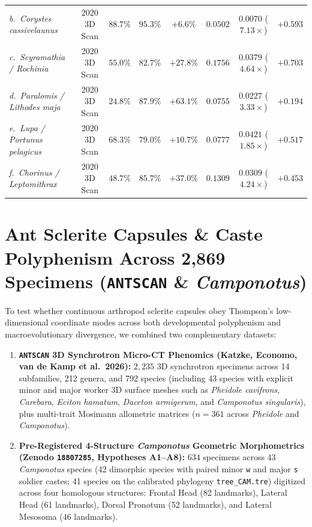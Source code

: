\documentclass[10pt,twocolumn]{article}
\begin{document}
\begin{table}[t!]
\begin{tabular}{lccccccc}
\midrule
\emph{b.\ Corystes cassivelaunus} & 2020 3D Scan & $88.7\%$ & $\mathbf{95.3\%}$ & $+6.6\%$ & $0.0502$ & $\mathbf{0.0070}$ ($7.13\times$) & $+0.593$ \\
\emph{c.\ Scyramathia / Rochinia} & 2020 3D Scan & $55.0\%$ & $\mathbf{82.7\%}$ & $\mathbf{+27.8\%}$ & $0.1756$ & $\mathbf{0.0379}$ ($4.64\times$) & $+0.703$ \\
\emph{d.\ Paralomis / Lithodes maja} & 2020 3D Scan & $24.8\%$ & $\mathbf{87.9\%}$ & $\mathbf{+63.1\%}$ & $0.0755$ & $\mathbf{0.0227}$ ($3.33\times$) & $+0.194$ \\
\emph{e.\ Lupa / Portunus pelagicus} & 2020 3D Scan & $68.3\%$ & $\mathbf{79.0\%}$ & $+10.7\%$ & $0.0777$ & $\mathbf{0.0421}$ ($1.85\times$) & $+0.517$ \\
\emph{f.\ Chorinus / Leptomithrax} & 2020 3D Scan & $48.7\%$ & $\mathbf{85.7\%}$ & $\mathbf{+37.0\%}$ & $0.1309$ & $\mathbf{0.0309}$ ($4.24\times$) & $+0.453$ \\
\bottomrule
\end{tabular}
\end{table}

\section{Ant Sclerite Capsules \& Caste Polyphenism Across 2,869 Specimens (\texttt{ANTSCAN} \& \emph{Camponotus})}

To test whether continuous arthropod sclerite capsules obey Thompson's low-dimensional coordinate modes across both developmental polyphenism and macroevolutionary divergence, we combined two complementary datasets:
\begin{enumerate}
  \item \textbf{\texttt{ANTSCAN} 3D Synchrotron Micro-CT Phenomics (Katzke, Economo, van de Kamp et al.\ 2026):} $2{,}235$ 3D synchrotron specimens across 14 subfamilies, 212 genera, and 792 species (including 43 species with explicit minor and major worker 3D surface meshes such as \emph{Pheidole cavifrons}, \emph{Carebara}, \emph{Eciton hamatum}, \emph{Daceton armigerum}, and \emph{Camponotus singularis}), plus multi-trait Mosimann allometric matrices ($n = 361$ across \emph{Pheidole} and \emph{Camponotus}).
  \item \textbf{Pre-Registered 4-Structure \emph{Camponotus} Geometric Morphometrics (Zenodo \texttt{18807285}, Hypotheses A1--A8):} $634$ specimens across 43 \emph{Camponotus} species (42 dimorphic species with paired minor \texttt{w} and major \texttt{s} soldier castes; 41 species on the calibrated phylogeny \texttt{tree\_CAM.tre}) digitized across four homologous structures: Frontal Head (82 landmarks), Lateral Head (61 landmarks), Dorsal Pronotum (52 landmarks), and Lateral Mesosoma (46 landmarks).
\end{enumerate}
\end{document}
